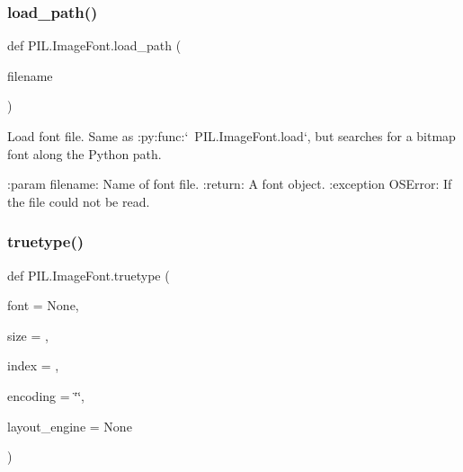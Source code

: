 \subsubsection{\texorpdfstring{load\+\_\+path()}{load\_path()}}
{\footnotesize\ttfamily def P\+I\+L.\+Image\+Font.\+load\+\_\+path (\begin{DoxyParamCaption}\item[{}]{filename }\end{DoxyParamCaption})}

\begin{DoxyVerb}Load font file. Same as :py:func:`~PIL.ImageFont.load`, but searches for a
bitmap font along the Python path.

:param filename: Name of font file.
:return: A font object.
:exception OSError: If the file could not be read.
\end{DoxyVerb}
 \mbox{\label{namespacePIL_1_1ImageFont_aca2b1cbcd4176634d6e190fc97367763}} 
\subsubsection{\texorpdfstring{truetype()}{truetype()}}
{\footnotesize\ttfamily def P\+I\+L.\+Image\+Font.\+truetype (\begin{DoxyParamCaption}\item[{}]{font = {\ttfamily None},  }\item[{}]{size = {},  }\item[{}]{index = {},  }\item[{}]{encoding = {\ttfamily \char`\"{}\char`\"{}},  }\item[{}]{layout\+\_\+engine = {\ttfamily None} }\end{DoxyParamCaption})}

